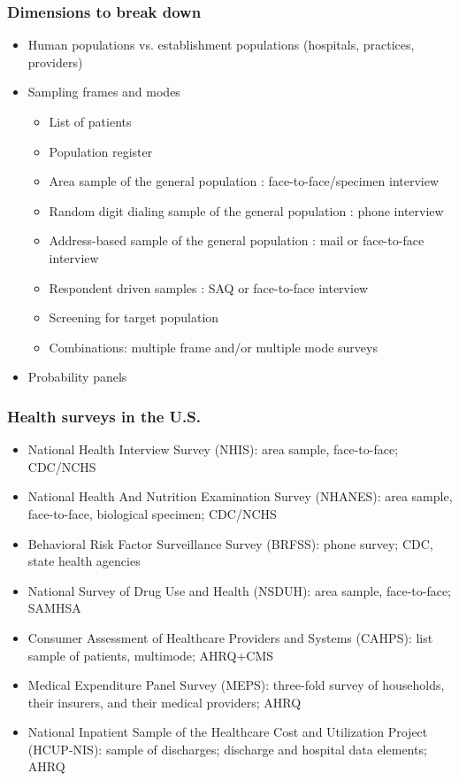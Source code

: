 \documentclass{beamer}
\begin{document}
\begin{frame}\frametitle{Dimensions to break down}

\begin{itemize}
    \item Human populations vs. establishment populations (hospitals, practices, providers)
    \item Sampling frames and modes
    \begin{itemize}
        \item List of patients
        \item Population register
        \item Area sample of the general population : face-to-face/specimen interview
        \item Random digit dialing sample of the general population : phone interview
        \item Address-based sample of the general population : mail or face-to-face interview
        \item Respondent driven samples : SAQ or face-to-face interview
        \item Screening for target population
        \item Combinations: multiple frame and/or multiple mode surveys
    \end{itemize}
    \item Probability panels
\end{itemize}

\end{frame}

\begin{frame}\frametitle{Health surveys in the U.S.}

\begin{itemize}
    \item National Health Interview Survey (NHIS): area sample, face-to-face; CDC/NCHS
    \item National Health And Nutrition Examination Survey (NHANES): area sample, face-to-face, biological specimen; CDC/NCHS
    \item Behavioral Risk Factor Surveillance Survey (BRFSS): phone survey; CDC, state health agencies
    \item National Survey of Drug Use and Health (NSDUH): area sample, face-to-face; SAMHSA
    \item Consumer Assessment of Healthcare Providers and Systems (CAHPS): list sample of patients, multimode; AHRQ+CMS
    \item Medical Expenditure Panel Survey (MEPS): three-fold survey of households, their insurers, and their medical providers; AHRQ
    \item National Inpatient Sample of the Healthcare Cost and Utilization Project (HCUP-NIS): 
    	sample of discharges; discharge and hospital data elements; AHRQ
\end{itemize}

\end{frame}
\end{document}

